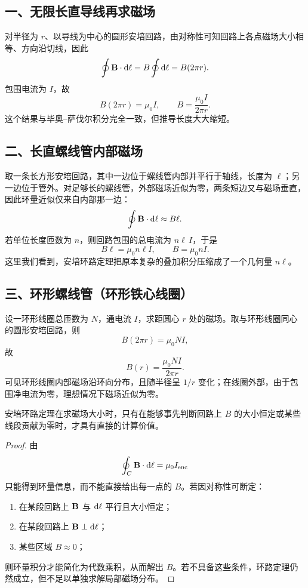 \subsection*{一、无限长直导线再求磁场}

对半径为 $r$、以导线为中心的圆形安培回路，由对称性可知回路上各点磁场大小相等、方向沿切线，因此
\[
  \oint \vb{B}\cdot\dd\vb{\ell}=B\oint \dd\ell=B(2\pi r).
\]
包围电流为 $I$，故
\[
  B(2\pi r)=\mu_0 I,
\qquad
  B=\frac{\mu_0 I}{2\pi r}.
\]
这个结果与毕奥--萨伐尔积分完全一致，但推导长度大大缩短。

\subsection*{二、长直螺线管内部磁场}

取一条长方形安培回路，其中一边位于螺线管内部并平行于轴线，长度为 $\ell$；另一边位于管外。对足够长的螺线管，外部磁场近似为零，两条短边又与磁场垂直，因此环量近似仅来自内部那一边：
\[
  \oint \vb{B}\cdot\dd\vb{\ell}\approx B\ell.
\]
若单位长度匝数为 $n$，则回路包围的总电流为 $n\ell\,I$，于是
\[
  B\ell=\mu_0 n\ell I,
  \qquad
  B=\mu_0 nI.
\]
这里我们看到，安培环路定理把原本复杂的叠加积分压缩成了一个几何量 $n\ell$。

\subsection*{三、环形螺线管（环形铁心线圈）}

设一环形线圈总匝数为 $N$，通电流 $I$，求距圆心 $r$ 处的磁场。取与环形线圈同心的圆形安培回路，则
\[
  B(2\pi r)=\mu_0 NI,
\]
故
\[
  B(r)=\frac{\mu_0 NI}{2\pi r}.
\]
可见环形线圈内部磁场沿环向分布，且随半径呈 $1/r$ 变化；在线圈外部，由于包围净电流为零，理想情况下磁场近似为零。

\begin{theorem}
安培环路定理在求磁场大小时，只有在能够事先判断回路上 $B$ 的大小恒定或某些线段贡献为零时，才具有直接的计算价值。
\end{theorem}

\begin{proof}
由
\[
  \oint_C \vb{B}\cdot\dd\vb{\ell}=\mu_0 I_{\mathrm{enc}}
\]
只能得到环量信息，而不能直接给出每一点的 $B$。若因对称性可断定：
\begin{enumerate}
  \item 在某段回路上 $\vb{B}$ 与 $\dd\vb{\ell}$ 平行且大小恒定；
  \item 在某段回路上 $\vb{B}\perp\dd\vb{\ell}$；
  \item 某些区域 $B\approx 0$；
\end{enumerate}
则环量积分才能简化为代数乘积，从而解出 $B$。若不具备这些条件，环路定理仍然成立，但不足以单独求解局部磁场分布。
\end{proof}

